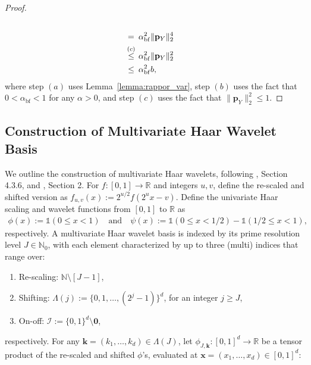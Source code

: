 \documentclass[twoside,11pt]{article}
\newcommand{\rvTwo}{Y}
\newcommand{\normSqMultinomMax}{b}
\newcommand{\dimDensity}{d} %
\newcommand{\probVec}{\mathbf{p}} %
\newcommand{\privacyParameter}{\alpha} %
\newcommand{\privacyParameterrappor}{\privacyParameter_{\mathrm{bf}}}
\newcommand{\wavFatherFunc}{\phi}
\newcommand{\wavMotherFunc}{\psi} %
\newcommand{\primResLev}{J}
\newcommand{\wavFatherUnivIndex}{k}
\newcommand{\wavFatherIndex}{\boldsymbol{\wavFatherUnivIndex}}
\begin{document}
\begin{appendix}
\begin{proof}
\begin{align*}
			\\ = \hskip 1.77mm &
			\privacyParameterrappor^2 
			\|\probVec_\rvTwo\|_2^4
			\\ \stackrel{(c)}{\leq} \hskip 1.36mm &
			\privacyParameterrappor^2
			\|\probVec_\rvTwo\|_2^2
			\\ \leq \hskip 1.72mm&
			\privacyParameterrappor^2
			\normSqMultinomMax,
		\end{align*}
		where
		step $(a)$ uses Lemma~\ref{lemma:rappor_var},
		step $(b)$ uses the fact that $0 < \privacyParameterrappor <1$ for any $\privacyParameter>0$,
		and
		step $(c)$ uses the fact that $\|\probVec_\rvTwo\|_2^2 \leq 1$.
	\end{proof}
	\subsection{Construction of Multivariate Haar Wavelet Basis}\label{appendix:basis}
	We  outline the construction of multivariate Haar wavelets, following \citet{Gine2015Besov}, Section 4.3.6, and \citet{Autin2010Wavlet}, Section 2.
	For  $f:[0,1] \to \mathbb{R}$ and integers $u, v$, define the re-scaled and shifted version as
	$f_{u,v}(x) := 2^{u/2}f(2^u x - v)$.
	Define the univariate Haar scaling and wavelet functions from $[0,1]$ to $\mathbb{R}$ as
	\begin{align*}
		\wavFatherFunc(x)
		:=
		\mathds{1}(0 \leq x < 1)
		\quad
		\text{and}
		\quad
		\wavMotherFunc(x)
		:=
		\mathds{1}(0 \leq x < 1/2) - \mathds{1}(1/2\leq x < 1),
	\end{align*}
	respectively.
	A multivariate Haar wavelet basis is indexed by its prime resolution level $\primResLev \in \mathbb{N}_0$, with each element characterized by up to three (multi) indices that range over:
	\begin{enumerate}
		\item Re-scaling: $\mathbb{N} \setminus [\primResLev-1]$,
		\item Shifting: $\Lambda(j) := \{0, 1, \ldots, (2^j - 1)\}^\dimDensity$, for an  integer $j \geq \primResLev$,
		\item On-off: $\mathcal{I} := \{0, 1\}^\dimDensity \setminus \mathbf{0}$,
	\end{enumerate}
	respectively.
	For any $\wavFatherIndex = (k_1, \ldots, k_\dimDensity) \in \Lambda(\primResLev)$, let $\wavFatherFunc_{\primResLev, \wavFatherIndex} : [0,1]^\dimDensity \to \mathbb{R}$ be a tensor product of the re-scaled and shifted $\wavFatherFunc$'s, evaluated at $\mathbf{x} = (x_1, \ldots, x_\dimDensity) \in [0,1]^\dimDensity$:

\end{appendix}
\end{document}
